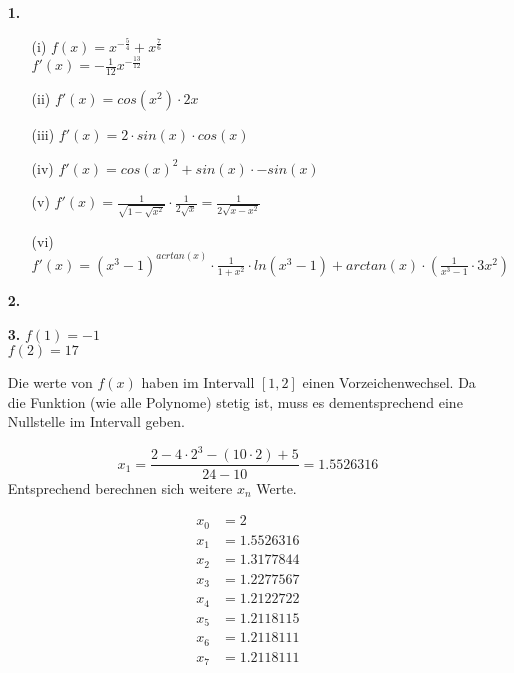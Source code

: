\documentclass[a4paper,11pt]{scrartcl}
\author{\authorinfo}
\title{\titleinfo}
\date{\today}
\begin{document}
\maketitle
\begin{enumerate}
    \item[\textbf{1.}]
        \begin{enumerate}
            \item[(i)]
                \(f(x) = x^{-\frac{5}{4}} + x^\frac{7}{6}\) \\
                \(f'(x)= -\frac{1}{12}x^{-\frac{13}{12}}\)
            \item[(ii)]
                \(f'(x)= cos(x^2) \cdot 2x\)
            \item[(iii)]
                \(f'(x)= 2 \cdot sin(x) \cdot cos(x)\)
            \item[(iv)]
                \(f'(x)= cos(x)^2 + sin(x) \cdot - sin(x)\)
            \item[(v)]  
                \(f'(x)= \frac{1}{\sqrt{1-\sqrt{x^2}}} \cdot \frac{1}{2 \sqrt{x}} = \frac{1}{2 \sqrt{x-x^2}}\)
            \item[(vi)]
                \(f'(x)= (x^3 - 1)^{acrtan(x)} \cdot \frac{1}{1+x^2} \cdot ln(x^3 - 1) + arctan(x) \cdot \left( \frac{1}{x^3-1} \cdot 3x^2 \right) \)
        \end{enumerate}

    \item[\textbf{2.}]

            
    \item[\textbf{3.}]
        \( f(1) = -1 \) \\
        \( f(2) = 17 \) 

        Die werte von $f(x)$ haben im Intervall $[1,2]$ einen Vorzeichenwechsel. Da die Funktion (wie alle Polynome) stetig ist, muss es dementsprechend eine Nullstelle im Intervall geben.

        \[ x_1 = \frac{2 - 4 \cdot 2^3 - (10 \cdot 2) + 5}{24 - 10} = 1.5526316\]
        Entsprechend berechnen sich weitere \(x_n\) Werte.


        \begin{align*}
        x_0 &= 2 \\
        x_1 &= 1.5526316 \\
        x_2 &= 1.3177844 \\
        x_3 &= 1.2277567 \\
        x_4 &= 1.2122722 \\
        x_5 &= 1.2118115 \\
        x_6 &= 1.2118111 \\
        x_7 &= 1.2118111 \\
        \end{align*}


\end{enumerate}
\end{document}
